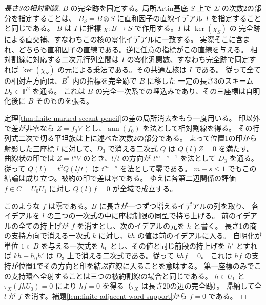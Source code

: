 \begin{proof}[長さ3の相対割線]
$B$ の完全跡を固定する。局所Artin基底 $S$ 上で $\Sigma$ の次数2の部分を指定することは、
$B_S=B\otimes S$ に直和因子の直線イデアル $I$ を指定することと同じである。
$B$ は $I$ に指標 $\chi:B\to S$ で作用する。$I$ は $\ker(\chi_S)$ の
完全跡による直交補、すなわちこの核の零化イデアルに一致する。
実際そこに含まれ、どちらも直和因子の直線である。逆に任意の指標がこの直線を与える。
相対割線に対応する二次元行列空間は $I$ の零化汎関数、すなわち完全跡で同定すれば
$\ker(\chi_S)$ の元による乗法である。その共通左核は $I$ である。
従って全ての相対左方向は、$B^*$ 内の指標を完全跡で $B$ に移した
一定の長さ3のスキーム $D_3\subset\mathbb P^2$ を通る。
これは $B$ の完全一次系での埋込みであり、その三座標は自明化後に $B$ そのものを張る。

定理\ref{thm:finite-marked-secant-pencil}の差の局所消去をもう一度用いる。
印以外で差が非零なら $Z=f_0 V$ とし、$\operatorname{ann}(f_0)$ を法として相対割線を得る。
その行列式二次で切る平坦族は上に述べた次数2の部分である。
よって位置1の印から射影した三座標 $l$ に対して、$D_3$ で消える二次式 $Q$ は $Q(l)Z=0$ を満たす。
曲線状の印では $Z=t^sV$ のとき、$l/t$ の方向が $t^{m-s-1}$ を法として $D_3$ を通る。
従って $Q(l)=t^2 Q(l/t)$ は $t^{m-s}$ を法として零である。
$m-s\le1$ でもこの結論は成り立つ。被約の印で差は零である。
ゆえに各第二辺関係の評価 $f\in C=U_0U_1$ に対し $Q(l)f=0$ が全域で成立する。

このような $f$ は零である。$B$ に長さが一つずつ増えるイデアルの列を取り、
各イデアルを $l$ の三つの一次式の中に座標制限の同型で持ち上げる。
前のイデアルの全ての持上げが $f$ を消すとし、次のイデアルの元を $h$ と書く。
長さ1の商の支持方向で消える一次式 $k$ に対し、$kh$ の値は前のイデアルに入る。
自明化が単位 $1\in B$ を与える一次式を $h_0$ とし、その値と同じ前段の持上げを $h'$ とすれば
$kh-h_0 h'$ は $D_3$ 上で消える二次式である。従って $khf=0$。
これは $hf$ の支持が位置1でその方向と印を結ぶ直線に入ることを意味する。
第一座標のみでこの支持環へ全射することは三つの被約割線の場合と同じである。
$h\in U_1$ と $\tau_X(fhU_0)=0$ により $hf=0$ を得る（$\tau_X$ は長さ20の辺の完全跡）。
帰納して全 $l$ が $f$ を消す。補題\ref{lem:finite-adjacent-word-support}から $f=0$ である。
\end{proof}
